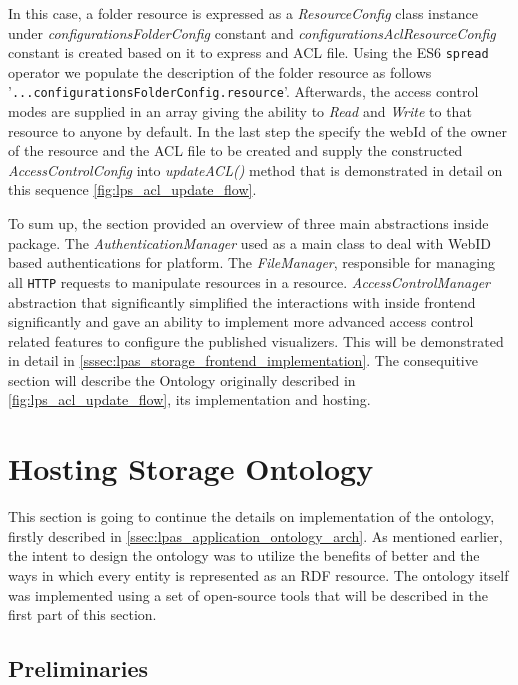 In this case, a folder resource is expressed as a \textit{ResourceConfig} class instance under \textit{configurationsFolderConfig} constant and \textit{configurationsAclResourceConfig} constant is created based on it to express and ACL file. Using the ES6 \texttt{spread} operator we populate the description of the folder resource as follows '\texttt{...configurationsFolderConfig.resource}'. Afterwards, the access control modes are supplied in an array giving the ability to \textit{Read} and \textit{Write} to that resource to anyone by default. In the last step the specify the webId of the owner of the resource and the ACL file to be created and supply the constructed \textit{AccessControlConfig} into \textit{updateACL()} method that is demonstrated in detail on this sequence \autoref{fig:lps_acl_update_flow}.

To sum up, the section provided an overview of three main abstractions inside \lpas{} package. The \textit{AuthenticationManager} used as a main class to deal with WebID based authentications for \lpa{} platform. The \textit{FileManager}, responsible for managing all \texttt{HTTP} requests to manipulate resources in a \solid{} resource. \textit{AccessControlManager} abstraction that significantly simplified the interactions with \solid{} inside \lpa{} frontend significantly and gave an ability to implement more advanced access control related features to configure the published \lpa{} visualizers. This will be demonstrated in detail in \autoref{sssec:lpas_storage_frontend_implementation}. The consequitive section will describe the \lpas{} Ontology originally described in \autoref{fig:lps_acl_update_flow}, its implementation and hosting.

\section{Hosting Storage Ontology}
\label{ssec:storage_ontology_implementation}

This section is going to continue the details on implementation of the \lpas{} ontology, firstly described in \autoref{ssec:lpas_application_ontology_arch}. As mentioned earlier, the intent to design the ontology was to utilize the benefits of \solid{} better and the ways in which every entity is represented as an RDF resource. The ontology itself was implemented using a set of open-source tools that will be described in the first part of this section. 

\subsection{Preliminaries}

